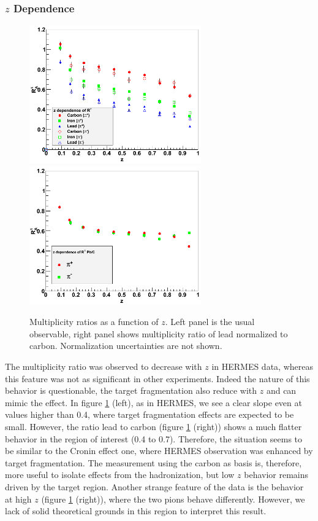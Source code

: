 \subsubsection{$z$ Dependence}

\begin{figure}[tbp]
\centering
\includegraphics[width=7.4cm] {chap6-fig/F_RvZ.png} 
\includegraphics[width=7.4cm] {chap6-fig/F_RvZ_PbC.png} 
\caption {Multiplicity ratios as a function of $z$. Left panel is the usual
observable, right panel shows multiplicity ratio of lead normalized to carbon. 
Normalization uncertainties are not shown.}
\label{fig:Rz}
\end{figure}

The multiplicity ratio was observed to decrease with $z$ in HERMES data, 
whereas this feature was not as significant in other experiments. Indeed the 
nature of this behavior is questionable, the target fragmentation also reduce 
with $z$ and can mimic the effect. In figure \ref{fig:Rz} (left), as in 
HERMES, we see a clear slope even at values higher than 0.4, where target fragmentation
effects are expected to be small. However, the ratio lead to carbon (figure 
\ref{fig:Rz} (right)) shows a much flatter behavior in the region of interest 
(0.4 to 0.7). Therefore, the situation seems to be 
similar to the Cronin effect one, where HERMES observation was enhanced by 
target fragmentation. The measurement using the carbon as basis is, therefore, 
more useful to isolate effects from the hadronization, but low $z$ behavior 
remains driven by the target region. Another strange feature of the data is 
the behavior at high $z$ (figure \ref{fig:Rz} (right)), where the two pions 
behave differently. However, we lack of solid theoretical grounds in this 
region to interpret this result.

